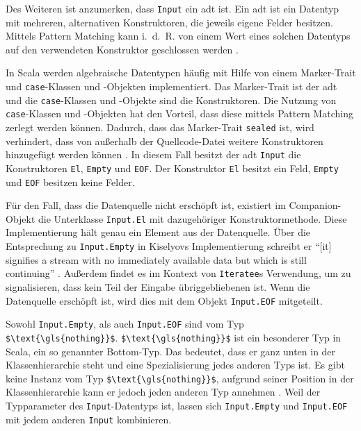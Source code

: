 Des Weiteren ist anzumerken, dass \lstinline|Input| ein \gls{adt} ist.
Ein \gls{adt} ist ein Datentyp mit mehreren, alternativen Konstruktoren, die jeweils eigene Felder besitzen.
Mittels Pattern Matching kann i.~d.~R. von einem Wert eines solchen Datentyps auf den verwendeten Konstruktor geschlossen werden \cite[vgl.][S.~14--15]{algebraic_data_type}.

In Scala werden algebraische Datentypen häufig mit Hilfe von einem Marker-Trait und \lstinline|case|-Klassen und -Objekten implementiert.
Das Marker-Trait ist der \gls{adt} und die \lstinline|case|-Klassen und -Objekte sind die Konstruktoren.
Die Nutzung von \lstinline|case|-Klassen und -Objekten hat den Vorteil, dass diese mittels Pattern Matching zerlegt werden können.
Dadurch, dass das Marker-Trait \lstinline|sealed| ist, wird verhindert, dass von außerhalb der Quellcode-Datei weitere Konstruktoren hinzugefügt werden können \cite[vgl.][]{algebraic_data_type_scala}.
In diesem Fall besitzt der \gls{adt} \lstinline|Input| die Konstruktoren \lstinline|El|, \lstinline|Empty| und \lstinline|EOF|.
Der Konstruktor \lstinline|El| besitzt ein Feld, \lstinline|Empty| und \lstinline|EOF| besitzen keine Felder.

Für den Fall, dass die Datenquelle nicht erschöpft ist, existiert im Companion-Objekt die Unterklasse \lstinline|Input.El| mit dazugehöriger Konstruktormethode.
Diese Implementierung hält genau ein Element aus der Datenquelle.
Über die Entsprechung zu \lstinline|Input.Empty| in Kiselyovs Implementierung schreibt er "`[it] signifies a stream with no immediately available data but which is still continuing"' \cite[vgl.][]{iteratee_io}.
Außerdem findet es im Kontext von \lstinline|Iteratee|s Verwendung, um zu signalisieren, dass kein Teil der Eingabe übriggebliebenen ist.
Wenn die Datenquelle erschöpft ist, wird dies mit dem Objekt \lstinline|Input.EOF| mitgeteilt.

Sowohl \lstinline|Input.Empty|, als auch \lstinline|Input.EOF| sind vom Typ \lstinline[mathescape]|$\text{\gls{nothing}}$|.
\lstinline[mathescape]|$\text{\gls{nothing}}$| ist ein besonderer Typ in Scala, ein so genannter Bottom-Typ.
Das bedeutet, dass er ganz unten in der Klassenhierarchie steht und eine Spezialisierung jedes anderen Typs ist.
Es gibt keine Instanz vom Typ \lstinline[mathescape]|$\text{\gls{nothing}}$|, aufgrund seiner Position in der Klassenhierarchie kann er jedoch jeden anderen Typ annehmen \cite[vgl.][S.~216]{programming_in_scala}.
Weil der Typparameter des \lstinline|Input|-Datentyps  ist, lassen sich \lstinline|Input.Empty| und \lstinline|Input.EOF| mit jedem anderen \lstinline|Input| kombinieren.

